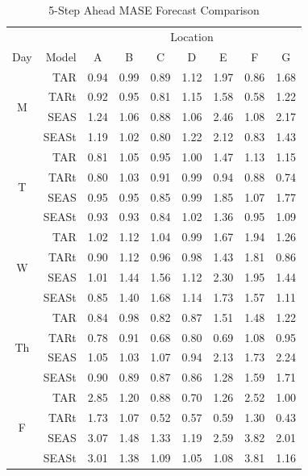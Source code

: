 \begin{table}[htbp]
\footnotesize
\centering
\caption{5-Step Ahead MASE Forecast Comparison}
\begin{tabular}{c|rccccccc}
  \hline
    & & \multicolumn{7}{c}{Location}\\
  \cline{5-7}
Day & Model & A & B & C & D & E & F & G \\ 
  \hline
  \multirow{4}{*}{M} & TAR & 0.94 & 0.99 & 0.89 & 1.12 & 1.97 & 0.86 & 1.68 \\ 
   & TARt & 0.92 & 0.95 & 0.81 & 1.15 & 1.58 & 0.58 & 1.22 \\ 
   & SEAS & 1.24 & 1.06 & 0.88 & 1.06 & 2.46 & 1.08 & 2.17 \\ 
   & SEASt & 1.19 & 1.02 & 0.80 & 1.22 & 2.12 & 0.83 & 1.43 \\ 
  \hline
  \multirow{4}{*}{T}  & TAR & 0.81 & 1.05 & 0.95 & 1.00 & 1.47 & 1.13 & 1.15 \\ 
   & TARt & 0.80 & 1.03 & 0.91 & 0.99 & 0.94 & 0.88 & 0.74 \\ 
   & SEAS & 0.95 & 0.95 & 0.85 & 0.99 & 1.85 & 1.07 & 1.77 \\ 
   & SEASt & 0.93 & 0.93 & 0.84 & 1.02 & 1.36 & 0.95 & 1.09 \\ 
  \hline
  \multirow{4}{*}{W}  & TAR & 1.02 & 1.12 & 1.04 & 0.99 & 1.67 & 1.94 & 1.26 \\ 
   & TARt & 0.90 & 1.12 & 0.96 & 0.98 & 1.43 & 1.81 & 0.86 \\ 
   & SEAS & 1.01 & 1.44 & 1.56 & 1.12 & 2.30 & 1.95 & 1.44 \\ 
   & SEASt & 0.85 & 1.40 & 1.68 & 1.14 & 1.73 & 1.57 & 1.11 \\ 
  \hline
  \multirow{4}{*}{Th}  & TAR & 0.84 & 0.98 & 0.82 & 0.87 & 1.51 & 1.48 & 1.22 \\ 
   & TARt & 0.78 & 0.91 & 0.68 & 0.80 & 0.69 & 1.08 & 0.95 \\ 
   & SEAS & 1.05 & 1.03 & 1.07 & 0.94 & 2.13 & 1.73 & 2.24 \\ 
   & SEASt & 0.90 & 0.89 & 0.87 & 0.86 & 1.28 & 1.59 & 1.71 \\ 
  \hline
  \multirow{4}{*}{F}  & TAR & 2.85 & 1.20 & 0.88 & 0.70 & 1.26 & 2.52 & 1.00 \\ 
   & TARt & 1.73 & 1.07 & 0.52 & 0.57 & 0.59 & 1.30 & 0.43 \\ 
   & SEAS & 3.07 & 1.48 & 1.33 & 1.19 & 2.59 & 3.82 & 2.01 \\ 
   & SEASt & 3.01 & 1.38 & 1.09 & 1.05 & 1.08 & 3.81 & 1.16 \\ 
   \hline
\end{tabular}
\label{ref:trafficmase5}
\end{table}

